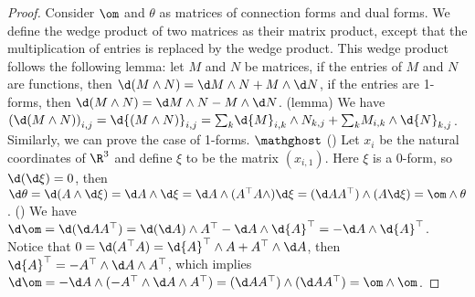 \documentclass[10pt]{article}
\begin{document}
\begin{proof}
    Consider $\om$ and $\theta$ as matrices of connection forms and dual forms. We define the wedge product of two matrices as their matrix product, except that the multiplication of entries is replaced by the wedge product. This wedge product follows the following lemma: let $M$ and $N$ be matrices, if the entries of $M$ and $N$ are functions, then $\d(M\wedge N)=\d M\wedge N+M\wedge\d N$, if the entries are 1-forms, then $\d(M\wedge N)=\d M\wedge N-M\wedge\d N$. (lemma) We have ${(\d(M\wedge N))}_{i,j}=\d{(M\wedge N)}_{i,j}={\sum}_{k}\d{M}_{i,k}\wedge{N}_{k,j}+{\sum}_{k}{M}_{i,k}\wedge\d{N}_{k,j}$. Similarly, we can prove the case of 1-forms. $\mathghost$ () Let ${x}_{i}$ be the natural coordinates of ${\R}^{3}$ and define $\xi$ to be the matrix $({x}_{i,1})$. Here $\xi$ is a 0-form, so $\d(\d\xi)=0$, then $\d\theta=\d(A\wedge\d\xi)=\d A\wedge\d\xi=\d A\wedge({A}^{\top}A\wedge)\d\xi=(\d A{A}^{\top})\wedge(A\d\xi)=\om\wedge\theta$. () We have $\d\om=\d(\d A{A}^{\top})=\d(\d A)\wedge{A}^{\top}-\d A\wedge\d{A}^{\top}=-\d A\wedge\d{A}^{\top}$. Notice that $0=\d({A}^{\top}A)=\d{A}^{\top}\wedge A+{A}^{\top}\wedge\d A$, then $\d{A}^{\top}=-{A}^{\top}\wedge\d A\wedge{A}^{\top}$, which implies $\d\om=-\d A\wedge(-{A}^{\top}\wedge\d A\wedge{A}^{\top})=(\d A{A}^{\top})\wedge(\d A{A}^{\top})=\om\wedge\om$.
\end{proof}
\end{document}
